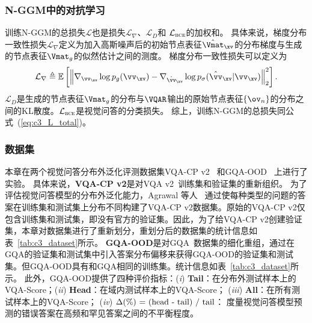 \subsubsection{N-GGM中的对抗学习}
训练N-GGM的总损失$\mathcal{L}$也是损失$\mathcal{L}_{\nabla}$、$\mathcal{L}_D$和 $\mathcal{L}_{\textsc{bce}}$的加权和。
具体来说，梯度分布一致性损失$\mathcal{L}_{\nabla}$定义为加入高斯噪声后的初始节点表征$\hat{\Vmat}_{\xv}$的分布梯度与生成的节点表征$\Vmat_g$的似然估计之间的测度。
梯度分布一致性损失可以定义为
\begin{equation} 
\mathcal{L}_{\nabla} \triangleq  \mathbb{E}\left[\left\| \nabla_{\vv_{\xv}}\log p_g(\vv_{\xv}) - \nabla_{\hat{\vv}_{\xv}}\log p_{\sigma}(\hat{\vv}_{\xv} | \vv_{\xv})  \right\|_2^2\right]. 
\label{eq:L_G2}
\end{equation} 
$\mathcal{L}_D$是生成的节点表征$\Vmat_g$的分布与$\VQAR$输出的原始节点表征$\{\ov_n\}$的分布之间的KL散度。$\mathcal{L}_{\textsc{bce}}$是视觉问答的分类损失。
综上，训练N-GGM的总损失同公式~(\ref{eq:c3_L_total})。




\subsubsection{数据集}
本章在两个视觉问答分布外泛化评测数据集VQA-CP v2~\cite{agrawal2018don} 和GQA-OOD~\cite{kervadec2021roses} 上进行了实验。
具体来说，\textbf{VQA-CP v2}是对VQA v2~\cite{shih2016look}训练集和验证集的重新组织。
为了评估视觉问答模型的分布外泛化能力，Agrawal 等人~\cite{agrawal2018don} 通过使每种类型的问题的答案在训练集和测试集上分布不同构建了VQA-CP v2数据集。原始的VQA-CP v2仅包含训练集和测试集，即没有官方的验证集。因此，为了给VQA-CP v2创建验证集，本章对数据集进行了重新划分，重划分后的数据集的统计信息如表~\ref{tab:c3_dataset}所示。
\textbf{GQA-OOD}是对GQA~\cite{hudson2019gqa}数据集的细化重组，通过在GQA的验证集和测试集中引入答案分布偏移来获得GQA-OOD的验证集和测试集。但GQA-OOD具有和GQA相同的训练集。统计信息如表~\ref{tab:c3_dataset}所示。
此外，GQA-OOD提供了四种评价指标：(\emph{i}) \textbf{Tail}：在分布外测试样本上的VQA-Score；(\emph{ii}) \textbf{Head}：在域内测试样本上的VQA-Score； (\emph{iii}) \textbf{All}：在所有测试样本上的VQA-Score； (\emph{iv}) $\Delta (\%)\textup{ = (head - tail) / tail}$： 度量视觉问答模型预测的错误答案在高频和罕见答案之间的不平衡程度。



